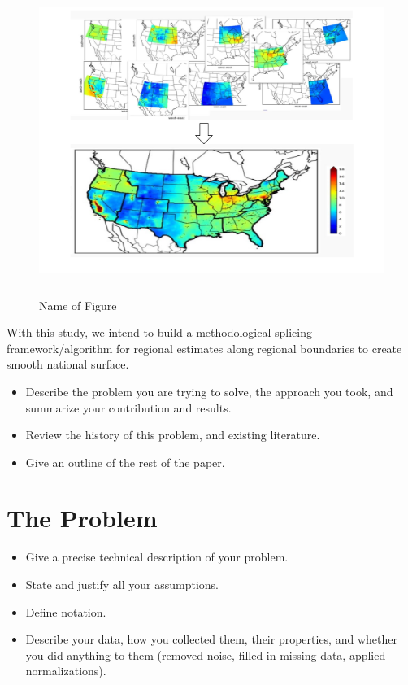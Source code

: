 \documentclass[10pt]{article}
\begin{document}
\begin{figure}[!ht]
	\centering
	\vspace{-5em}
	\includegraphics[width= 16cm, scale = 1, height = 10cm]{Image_1}
	\caption{Name of Figure}
	\label{fig:overlap}
\end{figure}

\begin{flushleft}
With this study, we intend to build a methodological splicing framework/algorithm for regional estimates along regional boundaries to create smooth national surface.
\end{flushleft}


\begin{itemize}
	\item Describe the problem you are trying to solve, the approach
	you took, and summarize your contribution and results.
	
	\item Review the history of this problem, and existing literature.
	
	\item Give an outline of the rest of the paper.
\end{itemize}

\section{The Problem}
\begin{itemize}
	\item Give a precise technical description of your problem. 
	
	\item State and justify all your assumptions. 
	
	\item Define notation. 
	
	\item Describe your data, how you collected them, their properties,
	and whether you did 
	anything to them (removed noise, filled in missing data, 
	applied normalizations).
\end{itemize}

\end{document}
